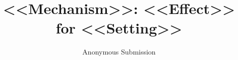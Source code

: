 \documentclass[runningheads]{llncs}   %
\newif\ifanon   \anontrue    %
\begin{document}
\title{<<Mechanism>>: <<Effect>> for <<Setting>>}
\ifanon
  \author{Anonymous Submission}
  \institute{}
\else
\fi
\maketitle




\ifanon\else
\subsubsection*{Acknowledgements.} <<Acknowledgements (camera-ready only).>>
\fi




\appendix

\end{document}
